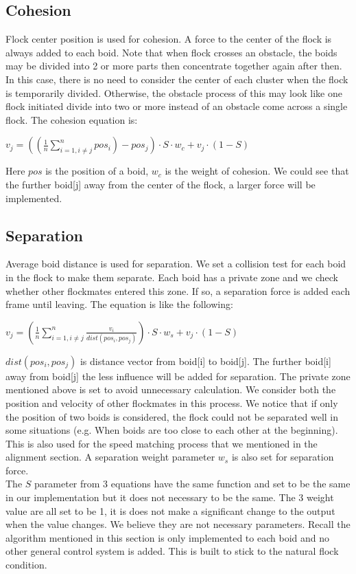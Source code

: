 \subsection{Cohesion}
Flock center position is used for cohesion. A force to the center of the flock is always added to each boid. Note that when flock crosses an obstacle, the boids may be divided into 2 or more parts then concentrate together again after then. In this case, there is no need to consider the center of each cluster when the flock is temporarily divided. Otherwise, the obstacle process of this may look like one flock initiated divide into two or more instead of an obstacle come across a single flock. The cohesion equation is:
\vspace{3mm}
\begin{center}
$v_j = ((\frac{1}{n}\sum_{i=1,i\neq{j}}^{n}{pos_i})-pos_j)\cdot S \cdot w_c + v_j \cdot (1-S)$
\end{center}
\vspace{3mm}
Here $pos$ is the position of a boid, $w_c$ is the weight of cohesion. We could see that the further boid[j] away from the center of the flock, a larger force will be implemented.

\subsection{Separation}
Average boid distance is used for separation. We set a collision test for each boid in the flock to make them separate. Each boid has a private zone and we check whether other flockmates entered this zone. If so, a separation force is added each frame until leaving. The equation is like the following:
\vspace{3mm}
\begin{center}
$v_j = (\frac{1}{n}\sum_{i=1,i\neq{j}}^{n}{\frac{v_i}{dist(pos_i,pos_j)}})\cdot S \cdot w_s + v_j \cdot (1-S)$
\end{center}
\vspace{3mm}
$dist(pos_i,pos_j)$ is distance vector from boid[i] to boid[j]. The further boid[i] away from boid[j] the less influence will be added for separation. The private zone mentioned above is set to avoid unnecessary calculation. We consider both the position and velocity of other flockmates in this process. We notice that if only the position of two boids is considered, the flock could not be separated well in some situations (e.g. When boids are too close to each other at the beginning). This is also used for the speed matching process that we mentioned in the alignment section. A separation weight parameter $w_s$ is also set for separation force.\break
\\
The $S$ parameter from 3 equations have the same function and set to be the same in our implementation but it does not necessary to be the same. The 3 weight value are all set to be 1, it is does not make a significant change to the output when the value changes. We believe they are not necessary parameters. Recall the algorithm mentioned in this section is only implemented to each boid and no other general control system is added. This is built to stick to the natural flock condition.